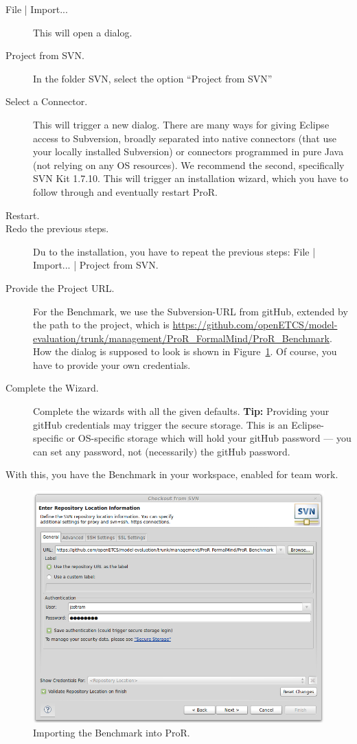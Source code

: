 \documentclass{template/openetcs_report}
\begin{document}
\begin{description}
\item[File | Import...] This will open a dialog.
\item[Project from SVN.] In the folder SVN, select the option ``Project from SVN''
\item[Select a Connector.] This will trigger a new dialog.  There are many ways for giving Eclipse access to Subversion, broadly separated into native connectors (that use your locally installed Subversion) or connectors programmed in pure Java (not relying on any OS resources).  We recommend the second, specifically SVN Kit 1.7.10.  This will trigger an installation wizard, which you have to follow through and eventually restart ProR.
\item[Restart.]
\item[Redo the previous steps.]  Du to the installation, you have to repeat the previous steps: File | Import... | Project from SVN.
\item[Provide the Project URL.] For the Benchmark, we use the Subversion-URL from gitHub, extended by the path to the project, which is \url{https://github.com/openETCS/model-evaluation/trunk/management/ProR_FormalMind/ProR_Benchmark}.  How the dialog is supposed to look is shown in Figure~\ref{fig:svn-config}.  Of course, you have to provide your own credentials.
\item[Complete the Wizard.]  Complete the wizards with all the given defaults.   \textbf{Tip:} Providing your gitHub credentials may trigger the secure storage.  This is an Eclipse-specific or OS-specific storage which will hold your gitHub password --- you can set any password, not (necessarily) the gitHub password.

\end{description}

With this, you have the Benchmark in your workspace, enabled for team work.

\begin{figure}[h!]
	\begin{center}
	\includegraphics[width=.8\textwidth]{img/svn-config.png}
	\end{center}
	\caption{Importing the Benchmark into ProR.}
	\label{fig:svn-config}
\end{figure}
\end{document}
